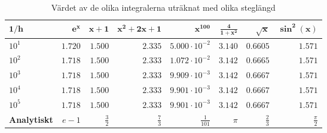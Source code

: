 \documentclass[a4paper,titlepage]{article}
\begin{document}
\begin{table}[h]
    \begin{tabular}{l | r | r | r | r | r | r | r}
        $\mathbf{1/h}$      & $\mathbf{e^x}$ & $\mathbf{x + 1}$ & $\mathbf{x^2 + 2x + 1}$ & $\mathbf{x^{100}}$     & $\mathbf{\frac{4}{1 + x^2}}$ & $\mathbf{\sqrt x}$ & $\mathbf{\sin^2(x)}$ \\ \hline
        $10^1$              & $1.720$        & $1.500$          & $2.335$                 & $5.000 \cdot 10^{-2}$  & $3.140$                      & $0.6605$                      & $1.571$ \\
        $10^2$              & $1.718$        & $1.500$          & $2.333$                 & $1.072 \cdot 10^{-2}$  & $3.142$                      & $0.6665$                      & $1.571$ \\
        $10^3$              & $1.718$        & $1.500$          & $2.333$                 & $9.909 \cdot 10^{-3}$  & $3.142$                      & $0.6667$                      & $1.571$ \\
        $10^4$              & $1.718$        & $1.500$          & $2.333$                 & $9.901 \cdot 10^{-3}$  & $3.142$                      & $0.6667$                      & $1.571$ \\
        $10^5$              & $1.718$        & $1.500$          & $2.333$                 & $9.901 \cdot 10^{-3}$  & $3.142$                      & $0.6667$                      & $1.571$ \\ \hline
        \textbf{Analytiskt} & $e-1$          & $\frac{3}{2}$    & $\frac{7}{3}$           & $\frac{1}{101}$        & $\pi$                        & $\frac{2}{3}$                        & $\frac{\pi}{2}$
    \end{tabular}
    \caption{Värdet av de olika integralerna uträknat med olika steglängd}
    \label{tab:values}
\end{table}
\end{document}
